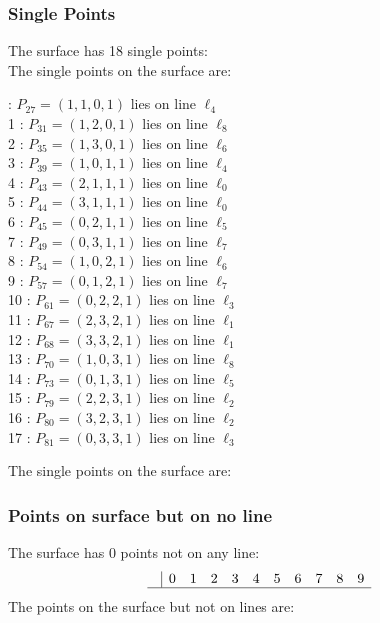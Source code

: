 \documentclass{article}
\begin{document}
{\subsubsection*{Single Points}
The surface has 18 single points:\\
The single points on the surface are:\\
\begin{multicols}{2}
 : $P_{27}=( 1, 1, 0, 1 )$ lies on line $\ell_{4}$\\
1 : $P_{31}=( 1, 2, 0, 1 )$ lies on line $\ell_{8}$\\
2 : $P_{35}=( 1, 3, 0, 1 )$ lies on line $\ell_{6}$\\
3 : $P_{39}=( 1, 0, 1, 1 )$ lies on line $\ell_{4}$\\
4 : $P_{43}=( 2, 1, 1, 1 )$ lies on line $\ell_{0}$\\
5 : $P_{44}=( 3, 1, 1, 1 )$ lies on line $\ell_{0}$\\
6 : $P_{45}=( 0, 2, 1, 1 )$ lies on line $\ell_{5}$\\
7 : $P_{49}=( 0, 3, 1, 1 )$ lies on line $\ell_{7}$\\
8 : $P_{54}=( 1, 0, 2, 1 )$ lies on line $\ell_{6}$\\
9 : $P_{57}=( 0, 1, 2, 1 )$ lies on line $\ell_{7}$\\
10 : $P_{61}=( 0, 2, 2, 1 )$ lies on line $\ell_{3}$\\
11 : $P_{67}=( 2, 3, 2, 1 )$ lies on line $\ell_{1}$\\
12 : $P_{68}=( 3, 3, 2, 1 )$ lies on line $\ell_{1}$\\
13 : $P_{70}=( 1, 0, 3, 1 )$ lies on line $\ell_{8}$\\
14 : $P_{73}=( 0, 1, 3, 1 )$ lies on line $\ell_{5}$\\
15 : $P_{79}=( 2, 2, 3, 1 )$ lies on line $\ell_{2}$\\
16 : $P_{80}=( 3, 2, 3, 1 )$ lies on line $\ell_{2}$\\
17 : $P_{81}=( 0, 3, 3, 1 )$ lies on line $\ell_{3}$\\
\end{multicols}
The single points on the surface are:\\
\subsubsection*{Points on surface but on no line}
The surface has 0 points not on any line:\\
$$
\begin{array}{r|*{10}{r}}
 & 0 & 1 & 2 & 3 & 4 & 5 & 6 & 7 & 8 & 9\\
\hline
\end{array}
$$
The points on the surface but not on lines are:\\
\begin{multicols}{2}
\noindent
\end{multicols}
}
\end{document}
